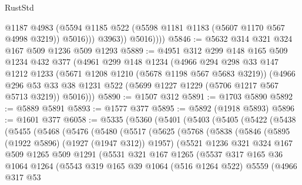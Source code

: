 \begin{lexlean}{RustStd}
\begin{coremodule}
                    @1187
                    @4983
                    (@5594 @1185 @522 (@5598 @1181 @1183 (@5607 @1170 @567 @4998 @3219)) @5016)))
                @3963))
            @5016))))
@5846 := @5632 @314 @321 @324 @167 @509 @1236 @509 @1293
@5889 := @4951
    @312
    @299
    @148
    @165
    @509
    @1234
    @432
    @377
    (@4961
      @299
      @148
      @1234
      (@4966
        @294
        @298
        @33
        @147
        @1212
        @1233
        (@5671 @1208 @1210 (@5678 @1198 @567 @5683 @3219))
        (@4966
          @296
          @53
          @33
          @38
          @1231
          @522
          (@5699 @1227 @1229 (@5706 @1217 @567 @5713 @3219))
          @5016)))
@5890 := @1507 @312
@5891 := @1703 @5890
@5892 := @5889 @5891
@5893 := @1577 @377
@5895 := @5892 (@1918 @5893)
@5896 := @1601 @377
@6058 := @5335
    (@5360
      (@5401
        (@5403
          (@5405
            (@5422
              (@5438
                (@5455
                  (@5468
                    (@5476
                      (@5480
                        (@5517
                          (@5625
                            (@5768
                              (@5838
                                (@5846
                                  (@5895 (@1922 @5896) (@1927 (@1947 @312)) @1957)
                                  (@5521
                                    @1236
                                    @321
                                    @324
                                    @167
                                    @509
                                    @1265
                                    @509
                                    @1291
                                    (@5531
                                      @321
                                      @167
                                      @1265
                                      (@5537
                                        @317
                                        @165
                                        @36
                                        @1064
                                        @1264
                                        (@5543
                                          @319
                                          @165
                                          @39
                                          @1064
                                          (@516 @1264 @522)
                                          @5559
                                          (@4966
                                            @317
                                            @53

\end{coremodule}
\end{lexlean}
